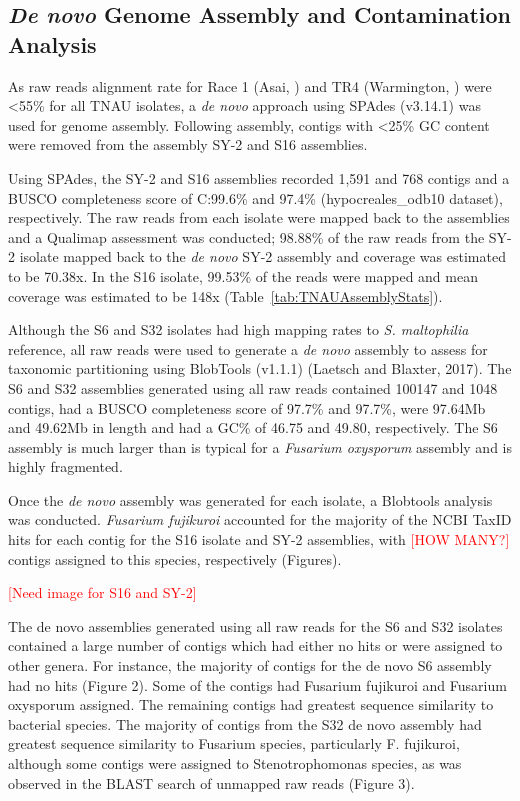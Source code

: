 

\subsection{\textit{De novo} Genome Assembly and Contamination Analysis}

As raw reads alignment rate for \Foc Race 1 (Asai, ) and \Foc TR4 (Warmington, ) were <55\% for all TNAU isolates, a \textit{de novo} approach using SPAdes (v3.14.1) was used for genome assembly. Following assembly, contigs with \textless 25\% GC content were removed from the assembly SY-2 and S16 assemblies.

Using SPAdes, the SY-2 and S16 assemblies recorded 1,591 and 768 contigs and a BUSCO completeness score of C:99.6\% and 97.4\% (hypocreales\_odb10 dataset), respectively. The raw reads from each isolate were mapped back to the assemblies and a Qualimap assessment was conducted; 98.88\% of the raw reads from the SY-2 isolate mapped back to the \textit{de novo} SY-2 assembly and coverage was estimated to be 70.38x. In the S16 isolate, 99.53\% of the reads were mapped and mean coverage was estimated to be 148x (Table~\ref{tab:TNAUAssemblyStats}).

Although the S6 and S32 isolates had high mapping rates to \textit{S. maltophilia} reference, all raw reads were used to generate a \textit{de novo} assembly to assess for taxonomic partitioning using BlobTools (v1.1.1) (Laetsch and Blaxter, 2017). The S6 and S32 assemblies generated using all raw reads contained 100147 and 1048 contigs, had a BUSCO completeness score of 97.7\% and 97.7\%, were 97.64Mb and 49.62Mb in length and had a GC\% of 46.75 and 49.80, respectively. The S6 assembly is much larger than is typical for a \textit{Fusarium oxysporum} assembly and is highly fragmented.  



Once the \textit{de novo} assembly was generated for each isolate, a Blobtools analysis was conducted. \textit{Fusarium fujikuroi} accounted for the majority of the NCBI TaxID hits for each contig for the S16 isolate and SY-2 assemblies, with \textcolor{red}{[HOW MANY?]} contigs assigned to this species, respectively (Figures). 

\textcolor{red}{[Need image for S16 and SY-2]}

The de novo assemblies generated using all raw reads for the S6 and S32 isolates contained a large number of contigs which had either no hits or were assigned to other genera. For instance, the majority of contigs for the de novo S6 assembly had no hits (Figure 2). Some of the contigs had Fusarium fujikuroi and Fusarium oxysporum assigned. The remaining contigs had greatest sequence similarity to bacterial species. The majority of contigs from the S32 de novo assembly had greatest sequence similarity to Fusarium species, particularly F. fujikuroi, although some contigs were assigned to Stenotrophomonas species, as was observed in the BLAST search of unmapped raw reads (Figure 3).  

